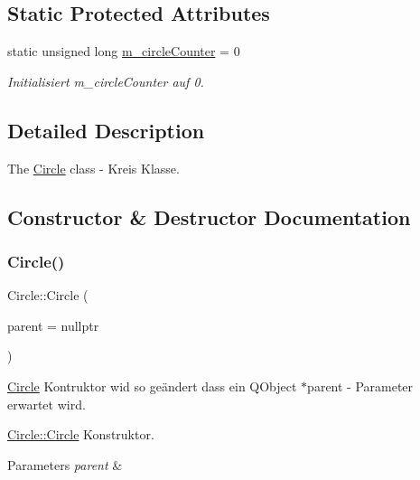 \subsection*{Static Protected Attributes}
\begin{DoxyCompactItemize}
\item 
static unsigned long \hyperlink{class_circle_a0cd7c4ac1de2acb420970134f30075b2}{m\+\_\+circle\+Counter} = 0
\begin{DoxyCompactList}\small\item\em Initialisiert m\+\_\+circle\+Counter auf 0. \end{DoxyCompactList}\end{DoxyCompactItemize}


\subsection{Detailed Description}
The \hyperlink{class_circle}{Circle} class -\/ Kreis Klasse. 

\subsection{Constructor \& Destructor Documentation}
\mbox{\label{class_circle_a9851632042d96e4e534bebbec65e92c3}} 
\subsubsection{\texorpdfstring{Circle()}{Circle()}\hspace{0.1cm}{\footnotesize\ttfamily [1/2]}}
{\footnotesize\ttfamily Circle\+::\+Circle (\begin{DoxyParamCaption}\item[{Q\+Object $\ast$}]{parent = {\ttfamily nullptr} }\end{DoxyParamCaption})}



\hyperlink{class_circle}{Circle} Kontruktor wid so geändert dass ein Q\+Object $\ast$parent -\/ Parameter erwartet wird. 

\hyperlink{class_circle_a9851632042d96e4e534bebbec65e92c3}{Circle\+::\+Circle} Konstruktor.


\begin{DoxyParams}{Parameters}
{\em parent} & \\
\hline
\end{DoxyParams}
\mbox{\label{class_circle_ae3f30436e645d73e368e8ee55f8d1650}} 
